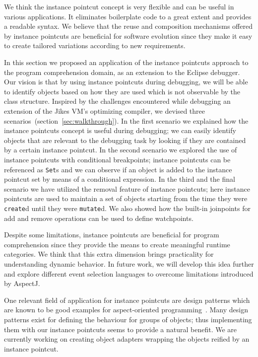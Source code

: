We think the instance pointcut concept is very flexible and can be useful in various applications.
It eliminates boilerplate code to a great extent and provides a readable syntax.
We believe that the reuse and composition mechanisms offered by instance pointcuts are beneficial for software evolution since they make it easy to create tailored variations according to new requirements.



In this section we proposed an application of the instance pointcuts approach to the program comprehension domain, as an extension to the Eclipse debugger.
Our vision is that by using instance pointcuts during debugging, we will be able to identify objects based on how they are used which is not observable by the class structure.
Inspired by the challenges encountered while debugging an extension of the Jikes VM's optimizing compiler, we devised three scenarios~(section~\ref{sec:walkthrough}).
In the first scenario we explained how the instance pointcuts concept is useful during debugging; we can easily identify objects that are relevant to the debugging task by looking if they are contained by a certain instance pointcut.
In the second scenario we explored the use of instance pointcuts with conditional breakpoints; instance pointcuts can be referenced as \lstinline!Set!s and we can observe if an object is added to the instance pointcut set by means of a conditional expression.
In the third and the final scenario we have utilized the removal feature of instance pointcuts; here instance pointcuts are used to maintain a set of objects starting from the time they were \lstinline!create!d until they were \lstinline!mutate!d.
We also showed how the built-in joinpoints for add and remove operations can be used to define watchpoints.

Despite some limitations, instance pointcuts are beneficial for program comprehension since they provide the means to create meaningful runtime categories.
We think that this extra dimension brings practicality for understanding dynamic behavior.
In future work, we will develop this idea further and explore different event selection languages to overcome limitations introduced by AspectJ.

One relevant field of application for instance pointcuts are design patterns which are known to be good examples for aspect-oriented programming~\cite{hannemann:oopsla02}.
Many design patterns exist for defining the behaviour for groups of objects; thus implementing them with our instance pointcuts seems to provide a natural benefit.
We are currently working on creating object adapters wrapping the objects reified by an instance pointcut.